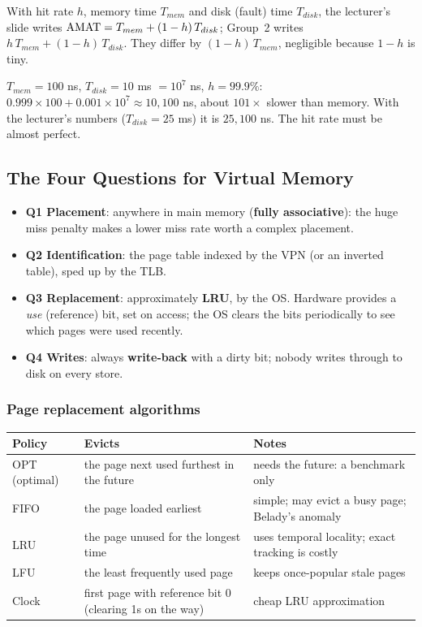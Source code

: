 \begin{prop}
With hit rate $h$, memory time $T_{mem}$ and disk (fault) time $T_{disk}$, the
lecturer's slide writes $\mathrm{AMAT}=T_{mem}+(1-h)\,T_{disk}$; Group~2 writes
$h\,T_{mem}+(1-h)\,T_{disk}$. They differ by $(1-h)\,T_{mem}$, negligible because
$1-h$ is tiny.
\end{prop}
\begin{eg}
$T_{mem}=100$ ns, $T_{disk}=10$ ms $=10^7$ ns, $h=99.9\%$:
$0.999\times100+0.001\times10^7\approx10{,}100$ ns, about $101\times$ slower than
memory. With the lecturer's numbers ($T_{disk}=25$ ms) it is $25{,}100$ ns. The
hit rate must be almost perfect.
\end{eg}

\subsection{The Four Questions for Virtual Memory}
\label{sec:vm-questions}

\begin{itemize}
  \item \textbf{Q1 Placement}: anywhere in main memory (\textbf{fully associative}):
  the huge miss penalty makes a lower miss rate worth a complex placement.
  \item \textbf{Q2 Identification}: the page table indexed by the VPN (or an inverted
  table), sped up by the TLB.
  \item \textbf{Q3 Replacement}: approximately \textbf{LRU}, by the OS. Hardware
  provides a \emph{use} (reference) bit, set on access; the OS clears the bits
  periodically to see which pages were used recently.
  \item \textbf{Q4 Writes}: always \textbf{write-back} with a dirty bit; nobody
  writes through to disk on every store.
\end{itemize}

\subsubsection{Page replacement algorithms}
\label{sec:vm-replacement}
\begin{center}
\small
\begin{tabular}{@{}lP{5.4cm}P{6.2cm}@{}}
\toprule
Policy & Evicts & Notes \\
\midrule
OPT (optimal) & the page next used furthest in the future & needs the future: a benchmark only \\
FIFO & the page loaded earliest & simple; may evict a busy page; Belady's anomaly \\
LRU & the page unused for the longest time & uses temporal locality; exact tracking is costly \\
LFU & the least frequently used page & keeps once-popular stale pages \\
Clock & first page with reference bit 0 (clearing 1s on the way) & cheap LRU approximation \\
\bottomrule
\end{tabular}
\end{center}

